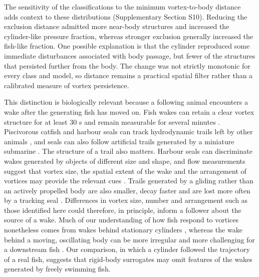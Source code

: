 \documentclass[openacc]{rsproca_new}
\begin{document}
The sensitivity of the classifications to the minimum vortex-to-body distance adds context to these distributions (Supplementary Section S10). Reducing the exclusion distance admitted more near-body structures and increased the cylinder-like pressure fraction, whereas stronger exclusion generally increased the fish-like fraction. One possible explanation is that the cylinder reproduced some immediate disturbances associated with body passage, but fewer of the structures that persisted further from the body. The change was not strictly monotonic for every class and model, so distance remains a practical spatial filter rather than a calibrated measure of vortex persistence.

This distinction is biologically relevant because a following animal encounters a wake after the generating fish has moved on. Fish wakes can retain a clear vortex structure for at least 30 s and remain measurable for several minutes \cite{hanke2000,hanke2004}. Piscivorous catfish and harbour seals can track hydrodynamic trails left by other animals \cite{pohlmann2001,pohlmann2004,schultepelkum2007}, and seals can also follow artificial trails generated by a miniature submarine \cite{dehnhardt2001}. The structure of a trail also matters. Harbour seals can discriminate wakes generated by objects of different size and shape, and flow measurements suggest that vortex size, the spatial extent of the wake and the arrangement of vortices may provide the relevant cues \cite{wieskotten2011}. Trails generated by a gliding rather than an actively propelled body are also smaller, decay faster and are lost more often by a tracking seal \cite{wieskotten2010}. Differences in vortex size, number and arrangement such as those identified here could therefore, in principle, inform a follower about the source of a wake. Much of our understanding of how fish respond to vortices nonetheless comes from wakes behind stationary cylinders \cite{liao2003jeb,liao2007,chagnaud2007}, whereas the wake behind a moving, oscillating body can be more irregular and more challenging for a downstream fish \cite{ortegajimenez2021}. Our comparison, in which a cylinder followed the trajectory of a real fish, suggests that rigid-body surrogates may omit features of the wakes generated by freely swimming fish.
\end{document}
